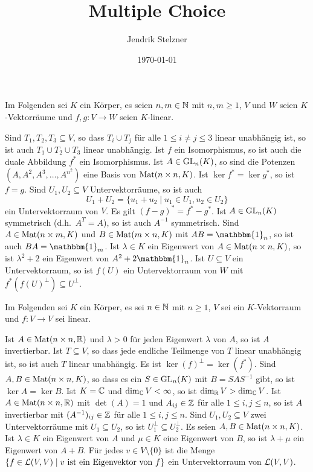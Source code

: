 \documentclass[a4paper,10pt]{exam}
\title{Multiple Choice}
\author{Jendrik Stelzner}
\date{\today}
\begin{document}
\begin{questions}



\question Im Folgenden sei $K$ ein Körper, es seien $n,m \in \mathbb{N}$ mit $n,m \geq 1$, $V$ und $W$ seien $K$-Vektorräume und $f, g \colon V \to W$ seien $K$-linear.
\begin{checkboxes}
 \choice
  Sind $T_1, T_2, T_3 \subseteq V$, so dass $T_i \cup T_j$ für alle $1 \leq i \neq j \leq 3$ linear unabhängig ist, so ist auch $T_1 \cup T_2 \cup T_3$ linear unabhängig.
 \choice
  Ist $f$ ein Isomorphismus, so ist auch die duale Abbildung $f^*$ ein Isomorphismus.
 \choice
  Ist $A \in \mathrm{GL}_n(K)$, so sind die Potenzen $(A, A^2, A^3, \dotsc, A^{n^2})$ eine Basis von $\mathrm{Mat}(n \times n, K)$.
 \choice
  Ist $\ker f^* = \ker g^*$, so ist $f = g$.
 \choice
  Sind $U_1, U_2 \subseteq V$ Untervektorräume, so ist auch
  \[
   U_1 + U_2 = \{u_1 + u_2 \mid u_1 \in U_1, u_2 \in U_2\}
  \]
  ein Untervektorraum von $V$.
 \choice
  Es gilt $(f-g)^* = f^* - g^*$.
 \choice
  Ist $A \in \mathrm{GL}_n(K)$ symmetrisch (d.h.\ $A^T = A$), so ist auch $A^{-1}$ symmetrisch.
 \choice
  Sind $A \in \mathrm{Mat}(n \times m, K)$ und $B \in \mathrm{Mat}(m \times n, K)$ mit $AB = \mathbbm{1}_n$, so ist auch $BA = \mathbbm{1}_m$.
 \choice
  Ist $\lambda \in K$ ein Eigenwert von $A \in \mathrm{Mat}(n \times n, K)$, so ist $\lambda^2 + 2$ ein Eigenwert von $A^2 + 2\mathbbm{1}_n$.
 \choice
  Ist $U \subseteq V$ ein Untervektorraum, so ist $f(U)$ ein Untervektorraum von $W$ mit $f^*(f(U)^\perp) \subseteq U^\perp$.
\end{checkboxes}



\question Im Folgenden sei $K$ ein Körper, es sei $n \in \mathbb{N}$ mit $n \geq 1$, $V$ sei ein $K$-Vektorraum und $f \colon V \to V$ sei linear.
\begin{checkboxes}
 \choice
  Ist $A \in \mathrm{Mat}(n \times n, \mathbb{R})$ und $\lambda > 0$ für jeden Eigenwert $\lambda$ von $A$, so ist $A$ invertierbar.
 \choice
  Ist $T \subseteq V$, so dass jede endliche Teilmenge von $T$ linear unabhängig ist, so ist auch $T$ linear unabhängig.
 \choice
  Es ist $\ker(f)^\perp = \ker(f^*)$.
 \choice
  Sind $A, B \in \mathrm{Mat}(n \times n, K)$, so dass es ein $S \in \mathrm{GL}_n(K)$ mit $B = S A S^{-1}$ gibt, so ist $\ker A = \ker B$.
 \choice
  Ist $K = \mathbb{C}$ und $\dim_{\mathbb{C}} V < \infty$, so ist $\dim_{\mathbb{R}} V > \dim_{\mathbb{C}} V$.
 \choice
  Ist $A \in \mathrm{Mat}(n \times n, \mathbb{R})$ mit $\det(A) = 1$ und $A_{ij} \in \mathbb{Z}$ für alle $1 \leq i,j \leq n$, so ist $A$ invertierbar mit $(A^{-1})_{ij} \in \mathbb{Z}$ für alle $1 \leq i,j \leq n$.
 \choice
  Sind $U_1, U_2 \subseteq V$ zwei Untervektorräume mit $U_1 \subseteq U_2$, so ist $U_1^\perp \subseteq U_2^\perp$.
 \choice
  Es seien $A, B \in \mathrm{Mat}(n \times n, K)$. Ist $\lambda \in K$ ein Eigenwert von $A$ und $\mu \in K$ eine Eigenwert von $B$, so ist $\lambda + \mu$ ein Eigenwert von $A + B$.
 \choice
  Für jedes $v \in V \setminus \{0\}$ ist die Menge $\{f \in \mathcal{L}(V,V) \mid \text{$v$ ist ein Eigenvektor von $f$}\}$ ein Untervektorraum von $\mathcal{L}(V,V)$.
\end{checkboxes}




\end{questions}
\end{document}
